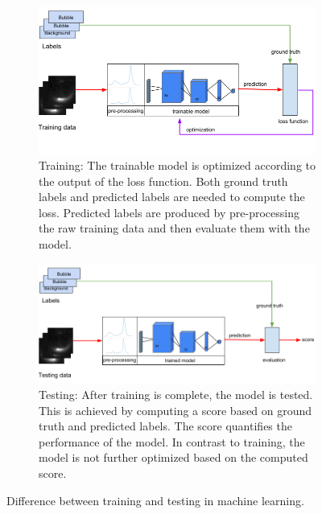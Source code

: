 		\begin{figure}
			\centering
			\begin{subfigure}[b]{\textwidth}
				\centering
				\includegraphics[scale=.6]{images/training_intro.png}
				\caption{Training: The trainable model is optimized according to the output of the loss function. Both ground truth labels and predicted labels are needed to compute the loss. Predicted labels are produced by pre-processing the raw training data and then evaluate them with the model. }
			\end{subfigure}
			\vfill
			\begin{subfigure}[b]{\textwidth}
				\centering
				\includegraphics[scale=.6]{images/testing_intro.png}
				\caption{Testing: After training is complete, the model is tested. This is achieved by computing a score based on ground truth and predicted labels. The score quantifies the performance of the model. In contrast to training, the model is not further optimized based on the computed score.}
			\end{subfigure}
			\caption{Difference between training and testing in machine learning.}
			\label{fig:machine_learning_intro}
		\end{figure}				
		
		
